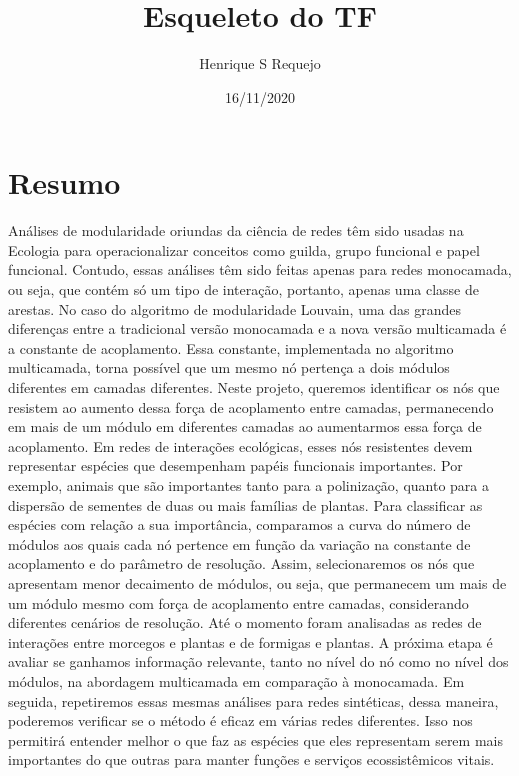 \documentclass[
  12pt,
]{article}
\title{Esqueleto do TF}
\author{Henrique S Requejo}
\date{16/11/2020}
\begin{document}
\maketitle




\pagebreak

\tableofcontents

\pagebreak


\hypertarget{resumo}{%
\section{Resumo}\label{resumo}}

Análises de modularidade oriundas da ciência de redes têm sido usadas na
Ecologia para operacionalizar conceitos como guilda, grupo funcional e
papel funcional. Contudo, essas análises têm sido feitas apenas para
redes monocamada, ou seja, que contém só um tipo de interação, portanto,
apenas uma classe de arestas. No caso do algoritmo de modularidade
Louvain, uma das grandes diferenças entre a tradicional versão
monocamada e a nova versão multicamada é a constante de acoplamento.
Essa constante, implementada no algoritmo multicamada, torna possível
que um mesmo nó pertença a dois módulos diferentes em camadas
diferentes. Neste projeto, queremos identificar os nós que resistem ao
aumento dessa força de acoplamento entre camadas, permanecendo em mais
de um módulo em diferentes camadas ao aumentarmos essa força de
acoplamento. Em redes de interações ecológicas, esses nós resistentes
devem representar espécies que desempenham papéis funcionais
importantes. Por exemplo, animais que são importantes tanto para a
polinização, quanto para a dispersão de sementes de duas ou mais
famílias de plantas. Para classificar as espécies com relação a sua
importância, comparamos a curva do número de módulos aos quais cada nó
pertence em função da variação na constante de acoplamento e do
parâmetro de resolução. Assim, selecionaremos os nós que apresentam
menor decaimento de módulos, ou seja, que permanecem um mais de um
módulo mesmo com força de acoplamento entre camadas, considerando
diferentes cenários de resolução. Até o momento foram analisadas as
redes de interações entre morcegos e plantas e de formigas e plantas. A
próxima etapa é avaliar se ganhamos informação relevante, tanto no nível
do nó como no nível dos módulos, na abordagem multicamada em comparação
à monocamada. Em seguida, repetiremos essas mesmas análises para redes
sintéticas, dessa maneira, poderemos verificar se o método é eficaz em
várias redes diferentes. Isso nos permitirá entender melhor o que faz as
espécies que eles representam serem mais importantes do que outras para
manter funções e serviços ecossistêmicos vitais.
\end{document}
